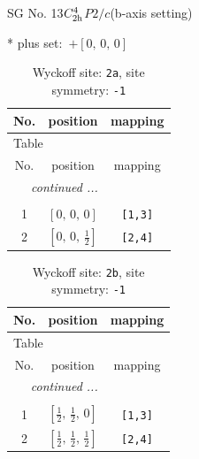 \documentclass[fleqn,8pt]{jsarticle}
\begin{document}
\setcounter{MaxMatrixCols}{32}

\renewcommand{\tablename}{Table~}
\renewcommand{\figurename}{Figure~}
\begin{center}
\LARGE
SG No. 13\quad$C_{\rm 2h}^{4}$\quad$P2/c$\quad(b-axis setting)\quad[ monoclinic ]
\end{center}
* plus set:\,\,\,$+\left[ 0,\, 0,\, 0 \right]$
\renewcommand{\arraystretch}{1.2}
\begin{longtable}{ccc}
\caption{Wyckoff site: {\tt 2a}, site symmetry: {\tt -1}}
 \\
 \hline \hline
No. & position & mapping \\ \hline \endfirsthead

\multicolumn{2}{l}{\tablename\ \thetable{}} \\
 \hline \hline
No. & position & mapping \\ \hline \endhead

 \hline \hline
\multicolumn{2}{r}{\footnotesize\it continued ...} \\ \endfoot

 \hline \hline
\multicolumn{2}{r}{} \\ \endlastfoot

1 & $\left[ 0,\, 0,\, 0 \right]$ & {\tt [1,3]} \\ \hline
2 & $\left[ 0,\, 0,\, \frac{1}{2} \right]$ & {\tt [2,4]} \\
\end{longtable}
\renewcommand{\arraystretch}{1.2}
\begin{longtable}{ccc}
\caption{Wyckoff site: {\tt 2b}, site symmetry: {\tt -1}}
 \\
 \hline \hline
No. & position & mapping \\ \hline \endfirsthead

\multicolumn{2}{l}{\tablename\ \thetable{}} \\
 \hline \hline
No. & position & mapping \\ \hline \endhead

 \hline \hline
\multicolumn{2}{r}{\footnotesize\it continued ...} \\ \endfoot

 \hline \hline
\multicolumn{2}{r}{} \\ \endlastfoot

1 & $\left[ \frac{1}{2},\, \frac{1}{2},\, 0 \right]$ & {\tt [1,3]} \\ \hline
2 & $\left[ \frac{1}{2},\, \frac{1}{2},\, \frac{1}{2} \right]$ & {\tt [2,4]} \\
\end{longtable}
\end{document}

